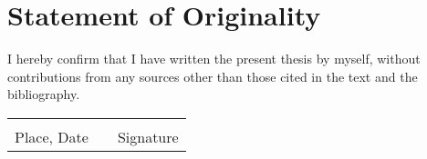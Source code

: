 \chapter{Statement of Originality}

I hereby confirm that I have written the present thesis by myself, without contributions from any sources other than those cited in the text and the bibliography.

\vspace{4cm}

\noindent
\begin{tabular}{@{}p{2.55in}@{}p{1in}p{2.55in}@{}}
    \dotfill & & \dotfill \\
    Place, Date & & Signature\\
\end{tabular}